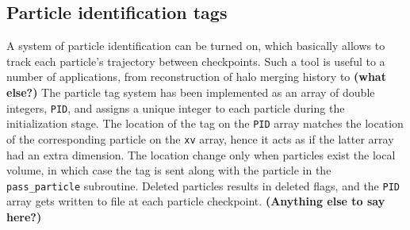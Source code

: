 \subsection{Particle identification tags}
\label{PID}

A system of particle identification can be turned on, which basically allows to track each particle's trajectory
between checkpoints. Such a tool is useful to a number of applications, from reconstruction of halo merging history to {\bf (what else?)}
The particle tag system has been implemented as an array of double integers, {\tt PID}, 
and assigns a unique integer to each particle during the initialization stage. The location of the tag on the {\tt PID} array 
matches the location of the corresponding particle on the {\tt xv} array, hence it acts as if the latter array had an extra dimension.
The location change only when particles exist the local volume, in which case the tag is sent along with the particle in the {\tt pass\_particle} subroutine.
Deleted particles results in deleted flags, and the {\tt PID} array gets written to file at each particle checkpoint.
{\bf (Anything else to say here?)}